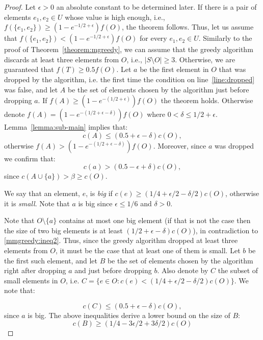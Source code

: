 \def\eps{0.104}
\begin{proof}
Let $\epsilon > 0$ an absolute constant to be determined later.
If there is a pair of elements $e_1, e_2 \in U$ whose value is high enough, i.e., $f(\{e_1, e_2\}) \geq (1 - e^{-1/2 + \epsilon})f(O)$, the theorem follows.
Thus, let us assume that $f(\{e_1, e_2\}) < (1 - e^{-1/2 + \epsilon})f(O)$ for every $e_1, e_2 \in U$.
Similarly to the proof of Theorem~\ref{theorem:mgreedy}, we can assume that the greedy algorithm discards at least three elements from $O$, i.e., $|S \setminus O| \geq 3$.
Otherwise, we are guaranteed that $f(T) \geq 0.5f(O)$.
% 
Let $a$ be the first element in $O$ that was dropped by the algorithm, i.e. the first time the condition on line~\ref{line:dropped} was false,
and let $A$ be the set of elements chosen by the algorithm just before dropping $a$.
% 
If $f(A) \geq (1 - e^{-(1/2 + \epsilon)})f(O)$ the theorem holds.
Otherwise denote $f(A) = (1 - e^{-(1/2 + \epsilon - \delta)})f(O)$ where $0 < \delta \leq 1/2 + \epsilon$.
% 
Lemma~\ref{lemma:sub-main} implies that: 
\begin{equation}
	\label{mmgreedy:ineq1}
	c(A) \leq (0.5 + \epsilon - \delta)c(O),
\end{equation}
otherwise $f(A) > (1-e^{-(1/2 + \epsilon - \delta)})f(O)$.
Moreover, since $a$ was dropped we confirm that:
\begin{equation}
	\label{mmgreedy:ineq2}
	c(a) > (0.5 -\epsilon + \delta)c(O),
\end{equation}
since $c(A \cup \{a\}) > \beta \geq c(O)$.

We say that an element, $e$, is \emph{big} if $c(e) \geq (1/4 + \epsilon/2 - \delta/2)c(O)$, 
otherwise it is \emph{small}.
Note that $a$ is big since $\epsilon \leq 1/6$ and $\delta > 0$.

Note that $O\setminus\{a\}$ contains at most one big element (if that is not the case then the size of two big elements is at least $(1/2 + \epsilon - \delta)c(O)$), in contradiction to \ref{mmgreedy:ineq2}.
Thus, since the greedy algorithm dropped at least three elements from $O$, it must be the case that at least one of them is small.
Let $b$ be the first such element, and let $B$ be the set of elements chosen by the 
algorithm right after dropping $a$ and just before dropping $b$.
Also denote by $C$ the subset of small elements in $O$, 
i.e. $C = \{e \in O : c(e) < (1/4 + \epsilon/2 - \delta/2)c(O)\}$.
We note that:

\begin{equation}
\label{mmgreedy:ineq3}
c(C) \leq (0.5 + \epsilon - \delta)c(O),
\end{equation}
since $a$ is big.
% 
The above inequalities derive a lower bound on the size of $B$:
\begin{equation}
	\label{mmgreedy:lower-bound-cB}
	c(B) \geq (1/4 - 3\epsilon/2 + 3\delta/2)c(O)
\end{equation}


\end{proof}
